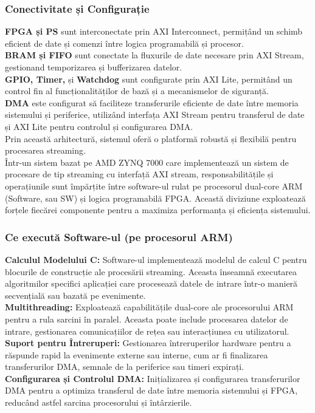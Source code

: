 \documentclass[12pt]{article}
\begin{document}
\subsubsection{Conectivitate și Configurație}
\textbf{FPGA și PS} sunt interconectate prin AXI Interconnect, permițând un schimb eficient de date și comenzi între logica programabilă și procesor.\\
\textbf{BRAM și FIFO} sunt conectate la fluxurile de date necesare prin AXI Stream, gestionand temporizarea și bufferizarea datelor.\\
\textbf{GPIO, Timer,} și \textbf{Watchdog} sunt configurate prin AXI Lite, permitând un control fin al funcționalităților de bază și a mecanismelor de siguranță.\\
\textbf{DMA} este configurat să faciliteze transferurile eficiente de date între memoria sistemului și periferice, utilizând interfața AXI Stream pentru transferul de date și AXI Lite pentru controlul și configurarea DMA.\\
Prin această arhitectură, sistemul oferă o platformă robustă și flexibilă pentru procesarea streaming.\\
Într-un sistem bazat pe AMD ZYNQ 7000 care implementează un sistem de procesare de tip streaming cu interfață AXI stream, responsabilitățile și operațiunile sunt împărțite între software-ul rulat pe procesorul dual-core ARM (Software, sau SW) și logica programabilă FPGA. Această diviziune exploatează forțele fiecărei componente pentru a maximiza performanța și eficiența sistemului.\\

\subsubsection{Ce execută Software-ul (pe procesorul ARM)}
\textbf{Calculul Modelului C:} Software-ul implementează modelul de calcul C pentru blocurile de construcție ale procesării streaming. Aceasta înseamnă executarea algoritmilor specifici aplicației care procesează datele de intrare într-o manieră secvențială sau bazată pe evenimente.\\
\textbf{Multithreading:} Exploatează capabilitățile dual-core ale procesorului ARM pentru a rula sarcini în paralel. Aceasta poate include procesarea datelor de intrare, gestionarea comunicațiilor de rețea sau interacțiunea cu utilizatorul.\\
\textbf{Suport pentru Întreruperi:} Gestionarea întreruperilor hardware pentru a răspunde rapid la evenimente externe sau interne, cum ar fi finalizarea transferurilor DMA, semnale de la periferice sau timeri expirați.\\
\textbf{Configurarea și Controlul DMA:} Inițializarea și configurarea transferurilor DMA pentru a optimiza transferul de date între memoria sistemului și FPGA, reducând astfel sarcina procesorului și întârzierile.\\
\end{document}
